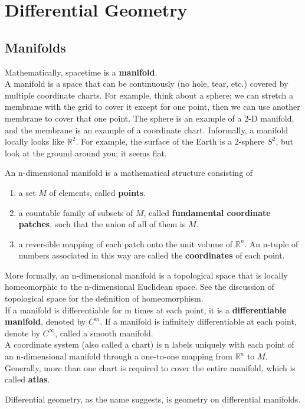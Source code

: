 \documentclass[12pt]{article}
\theoremstyle{mystyle}{\newtheorem{definition}{Definition}[subsection]}
\theoremstyle{mystyle}{\newtheorem{theorem}[definition]{Theorem}}
\theoremstyle{mystyle}{\newtheorem*{remark}{Remark}}
\theoremstyle{mystyle}{\newtheorem{example}{Example}[subsection]}
\theoremstyle{mystyle}{\newtheorem{examples}{Examples}[subsection]}
\theoremstyle{mystyle}{\newtheorem{cthm}{}[subsection]}
\begin{document}
\newpage

\section{Differential Geometry}

\subsection{Manifolds}
Mathematically, spacetime is a \textbf{manifold}.\\
A manifold is a space that can be continuously (no hole, tear, etc.) covered by multiple coordinate charts.
For example, think about a sphere; we can stretch a membrane with the grid to cover it except for one point, then we can
use another membrane to cover that one point. The sphere is an example of a 2-D manifold, and the membrane is an example of a coordinate chart.
Informally, a manifold locally looks like \(\mathbb{R}^2\).
For example, the surface of the Earth is a 2-sphere $S^2$, but look at the ground around you; it seems flat.
\begin{definition}
  An n-dimensional manifold is a mathematical structure consisting of
  \begin{enumerate}
    \item a set \(M\) of elements, called \textbf{points}.
    \item a countable family of subsets of \(M\), called \textbf{fundamental coordinate patches},
          such that the union of all of them is \(M\).
    \item a reversible mapping of each patch onto the unit volume of \(\mathbb{R}^n\). An n-tuple of numbers associated
          in this way are called the \textbf{coordinates} of each point.
  \end{enumerate}
  More formally, an n-dimensional manifold is a topological space that is locally homeomorphic to the n-dimensional Euclidean space.
  See the discussion of topological space for the definition of homeomorphism.\\
  If a manifold is differentiable for m times at each point, it is a \textbf{differentiable manifold}, denoted by \(C^m\).
  If a manifold is infinitely differentiable at each point, denote by \(C^\infty\), called a smooth manifold.\\
  A coordinate system (also called a chart) is n labels uniquely with each point of an n-dimensional manifold through a one-to-one mapping from
  $\mathbb{R}^n$ to $M$.\\
  Generally, more than one chart is required to cover the entire manifold, which is called \textbf{atlas}.
\end{definition}
Differential geometry, as the name suggests, is geometry on differential manifolds.
\end{document}

